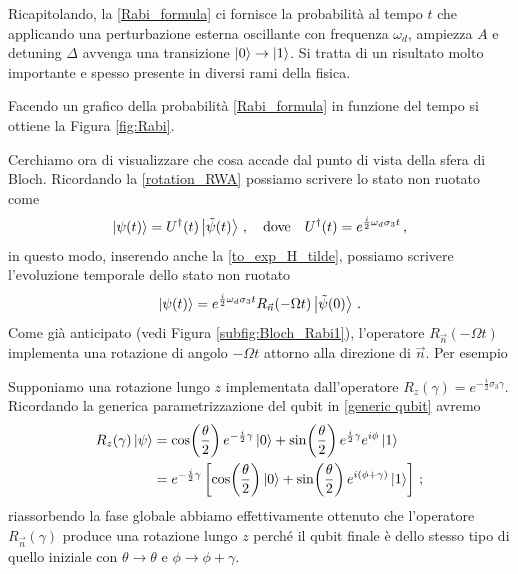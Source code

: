 \begin{esempio}
    \noindent Ricapitolando, la \eqref{Rabi_formula} ci fornisce la probabilità al tempo $t$ che applicando una perturbazione esterna oscillante con frequenza $\omega_d$, ampiezza $A$ e detuning $\Delta$ avvenga una transizione $\ket{0} \to \ket{1}$. Si tratta di un risultato molto importante e spesso presente in diversi rami della fisica. 
    
    \noindent Facendo un grafico della probabilità \eqref{Rabi_formula} in funzione del tempo si ottiene la Figura \ref{fig:Rabi}. 
\end{esempio} 

\noindent Cerchiamo ora di visualizzare che cosa accade dal punto di vista della sfera di Bloch. Ricordando la \eqref{rotation_RWA} possiamo scrivere lo stato non ruotato come
\begin{equation*}
    \ket{\psi(t)} = U^\dag (t) \ket{\tilde{\psi}(t)} \, , \quad \text{dove} \quad U^\dag (t) = e^{\frac{i}{2} \omega_d \sigma_3 t} \, ,
\end{equation*}
in questo modo, inserendo anche la \eqref{to_exp_H_tilde}, possiamo scrivere l'evoluzione temporale dello stato non ruotato
\begin{equation}\label{te_non_rotated}
    \ket{\psi(t)} = e^{\frac{i}{2} \omega_d \sigma_3 t} R_{\vec n}(- \Omega t) \ket{\tilde{\psi}(0)} \, .
\end{equation}
Come già anticipato (vedi Figura \ref{subfig:Bloch_Rabi1}), l'operatore $R_{\vec n}(-\Omega t)$ implementa una rotazione di angolo $-\Omega t$ attorno alla direzione di $\vec n$. Per esempio

\begin{esempio}
    Supponiamo una rotazione lungo $z$ implementata dall'operatore $R_z(\gamma) = e^{-\frac{i}{2} \sigma_3 \gamma}$. Ricordando la generica parametrizzazione del qubit in \eqref{generic qubit} avremo
    \begin{align*}
        R_z(\gamma) \ket{\psi} &= \cos \! \left( \frac{\theta}{2} \right) e^{-\frac{i}{2} \gamma} \ket{0} + \sin \! \left( \frac{\theta}{2} \right) e^{\frac{i}{2} \gamma} e^{i \phi} \ket{1} \\
        &= e^{-\frac{i}{2} \gamma} \left[ \cos \! \left( \frac{\theta}{2} \right) \ket{0} + \sin \! \left( \frac{\theta}{2} \right) e^{i(\phi + \gamma)} \ket{1} \right] \, ;
    \end{align*}
    riassorbendo la fase globale abbiamo effettivamente ottenuto che l'operatore $R_{\vec n}(\gamma)$ produce una rotazione lungo $z$ perché il qubit finale è dello stesso tipo di quello iniziale con $\theta \to \theta$ e $\phi \to \phi + \gamma$. 
\end{esempio}

